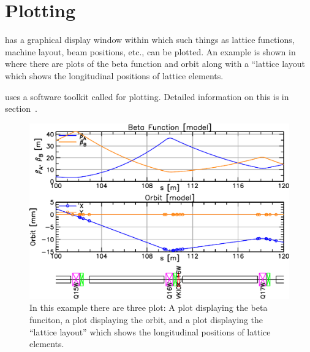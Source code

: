\chapter{Plotting}
\label{c:plotting}

\tao has a graphical display window within which such things as lattice functions, machine layout,
beam positions, etc., can be plotted. An example is shown in  where there are plots
of the beta function and orbit along with a ``lattice layout which shows the longitudinal positions
of lattice elements. 

\tao uses a software toolkit called  for plotting. Detailed information on this is in
section~.

\clearpage

\begin{figure}[tb]
  \centering
  \includegraphics[width=5.0in]{plot-typical.pdf}
  \caption[An example of a plot display.]
{In this example there are three plot: A plot displaying the beta funciton, a plot displaying the orbit, and
a plot displaying the ``lattice layout'' which shows the longitudinal positions of lattice elements.}
  \label{f:plot.typ}
\end{figure}


